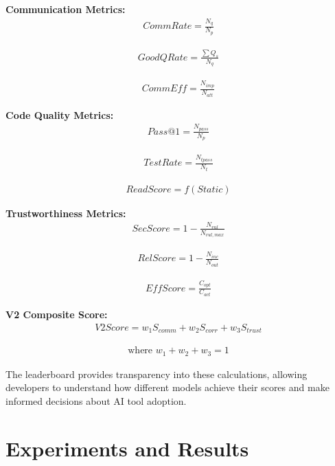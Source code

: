 \documentclass[conference]{IEEEtran}
\begin{document}
\textbf{Communication Metrics:}
\begin{align}
    \mathit{CommRate} = \frac{N_{q}}{N_{p}}
\end{align}

\begin{align}
    \mathit{GoodQRate} = \frac{\sum Q_{s}}{N_{q}}
\end{align}

\begin{align}
    \mathit{CommEff} = \frac{N_{imp}}{N_{att}}
\end{align}

\textbf{Code Quality Metrics:}
\begin{align}
    \mathit{Pass@1} = \frac{N_{pass}}{N_{p}}
\end{align}

\begin{align}
    \mathit{TestRate} = \frac{N_{tpass}}{N_{t}}
\end{align}

\begin{align}
    \mathit{ReadScore} = f(\mathit{Static})
\end{align}

\textbf{Trustworthiness Metrics:}
\begin{align}
    \mathit{SecScore} = 1 - \frac{N_{vul}}{N_{vul,max}}
\end{align}

\begin{align}
    \mathit{RelScore} = 1 - \frac{N_{inc}}{N_{out}}
\end{align}

\begin{align}
    \mathit{EffScore} = \frac{C_{opt}}{C_{act}}
\end{align}

\textbf{V2 Composite Score:}
\begin{align}
    \mathit{V2Score} = w_1 S_{comm} + w_2 S_{corr} + w_3 S_{trust}
\end{align}

\begin{align}
    \text{where } w_1 + w_2 + w_3 = 1
\end{align}

The leaderboard provides transparency into these calculations, allowing developers to understand how different models achieve their scores and make informed decisions about AI tool adoption.

\section{Experiments and Results}
\end{document}
